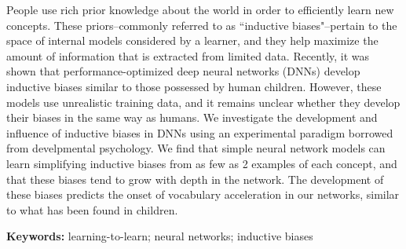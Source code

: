 People use rich prior knowledge about the world in order
to efficiently learn new concepts. These priors--commonly referred to as
``inductive biases"--pertain to the space of internal models considered by a
learner, and they help maximize the amount of information that is extracted
from limited data. Recently, it was shown that performance-optimized
deep neural networks (DNNs) develop inductive biases similar to those
possessed by human children. However, these models use unrealistic training
data, and it remains unclear whether they develop their biases in the same way
as humans. We investigate the development and influence of inductive biases
in DNNs using an experimental paradigm borrowed from develpmental psychology.
We find that simple neural network models can learn simplifying inductive
biases from as few as 2 examples of each concept, and that these biases tend
to grow with depth in the network. The development of these biases predicts
the onset of vocabulary acceleration in our networks, similar to what
has been found in children.

\textbf{Keywords:}
learning-to-learn; neural networks; inductive biases